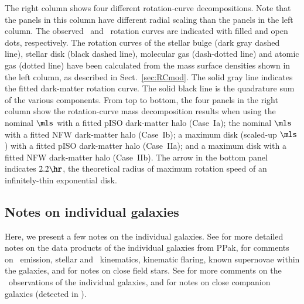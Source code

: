 \documentclass[traditabstract]{aa} %
\begin{document}
{The right column shows four different rotation-curve decompositions. Note that the panels
in this column have different radial scaling than the panels in the left column. The
observed \halp\ and \hone\ rotation curves are indicated with filled and open dots,
respectively. The rotation curves of the stellar bulge (dark gray dashed line), stellar
disk (black dashed line), molecular gas (dash-dotted line) and atomic gas (dotted line)
have been calculated from the mass surface densities shown in the left column, as
described in Sect.~\ref{sec:RCmod}. The solid gray line indicates the fitted dark-matter
rotation curve. The solid black line is the quadrature sum of the various components. 
From top to bottom, the four panels in the right column show the rotation-curve mass
decomposition results when using the nominal $\mls$ with a fitted pISO dark-matter halo
(Case~Ia); the nominal $\mls$ with a fitted NFW dark-matter halo (Case~Ib); a maximum disk
(scaled-up $\mls$) with a fitted pISO dark-matter halo (Case~IIa); and a maximum disk with
a fitted NFW dark-matter halo (Case~IIb). The arrow in the bottom panel indicates
$2.2\hr$, the theoretical radius of maximum rotation speed of an infinitely-thin
exponential disk.


\subsection{Notes on individual galaxies}
\label{app:gal}
Here, we present a few notes on the individual galaxies.
See  for more detailed notes on the data products
of the individual galaxies from PPak, for comments on \oiii\ emission, stellar and
\oiii\ kinematics, kinematic flaring, known supernovae within the galaxies, and for
notes on close field stars.
See \cite{martinsson2011} for more comments on the \hone\ observations of the individual
galaxies, and for notes on close companion galaxies (detected in \hone).

}
\end{document}

